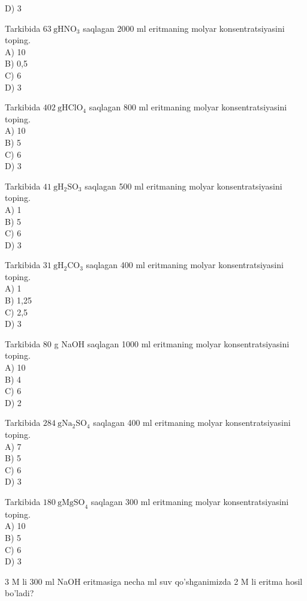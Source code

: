 D) 3
  \item Tarkibida $63 \mathrm{~g} \mathrm{HNO}_{3}$ saqlagan 2000 ml eritmaning molyar konsentratsiyasini toping.\\
A) 10\\
B) 0,5\\
C) 6\\
D) 3
  \item Tarkibida $402 \mathrm{~g} \mathrm{HClO}_{4}$ saqlagan 800 ml eritmaning molyar konsentratsiyasini toping.\\
A) 10\\
B) 5\\
C) 6\\
D) 3
  \item Tarkibida $41 \mathrm{~g} \mathrm{H}_{2} \mathrm{SO}_{3}$ saqlagan 500 ml eritmaning molyar konsentratsiyasini toping.\\
A) 1\\
B) 5\\
C) 6\\
D) 3
  \item Tarkibida $31 \mathrm{~g} \mathrm{H}_{2} \mathrm{CO}_{3}$ saqlagan 400 ml eritmaning molyar konsentratsiyasini toping.\\
A) 1\\
B) 1,25\\
C) 2,5\\
D) 3
  \item Tarkibida 80 g NaOH saqlagan 1000 ml eritmaning molyar konsentratsiyasini toping.\\
A) 10\\
B) 4\\
C) 6\\
D) 2
  \item Tarkibida $284 \mathrm{~g} \mathrm{Na}_{2} \mathrm{SO}_{4}$ saqlagan 400 ml eritmaning molyar konsentratsiyasini toping.\\
A) 7\\
B) 5\\
C) 6\\
D) 3
  \item Tarkibida $180 \mathrm{~g} \mathrm{MgSO}_{4}$ saqlagan 300 ml eritmaning molyar konsentratsiyasini toping.\\
A) 10\\
B) 5\\
C) 6\\
D) 3
  \item 3 M li 300 ml NaOH eritmasiga necha ml suv qo'shganimizda 2 M li eritma hosil bo'ladi?\\
